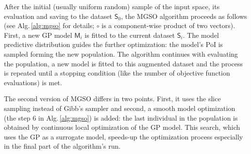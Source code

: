 \documentclass{itatnew}
\begin{document}
After the initial (usually uniform random) sample of the input space, its evaluation and saving to the dataset $\mathsf{S}_0$, the MGSO algorithm proceeds as follows (see Alg.\,\ref{alg:mgso} for details; $\circ$ is a component-wise product of two vectors). First, a new GP model $\mathsf{M}_i$ is fitted to the current dataset $\mathsf{S}_i$. The model predictive distribution guides the further optimization: the model's PoI is sampled forming the new population.
The algorithm continues with evaluating the population, a new model is fitted to this augmented dataset and the process is repeated until a stopping condition (like the number of objective function evaluations) is met.

The second version of MGSO differs in two points. First, it uses the slice sampling instead of Gibb's sampler and second, a smooth model optimization (the step 6 in Alg.\,\ref{alg:mgso}) is added: the last individual in the population is obtained by continuous local optimization of the GP model. This search, which uses the GP as a surrogate model, speeds-up the optimization process especially in the final part of the algorithm's run. 
\end{document}
